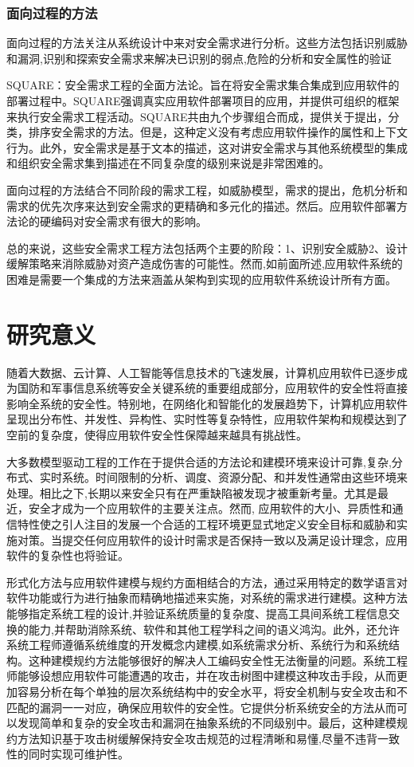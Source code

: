 \subsubsection{面向过程的方法}
\par
面向过程的方法关注从系统设计中来对安全需求进行分析。这些方法包括识别威胁和漏洞,识别和探索安全需求来解决已识别的弱点,危险的分析和安全属性的验证
\par
SQUARE：安全需求工程的全面方法论。旨在将安全需求集合集成到应用软件的部署过程中。SQUARE强调真实应用软件部署项目的应用，并提供可组织的框架来执行安全需求工程活动。SQUARE共由九个步骤组合而成，提供关于提出，分类，排序安全需求的方法。但是，这种定义没有考虑应用软件操作的属性和上下文行为。此外，安全需求是基于文本的描述，这对讲安全需求与其他系统模型的集成和组织安全需求集到描述在不同复杂度的级别来说是非常困难的。
\par
面向过程的方法结合不同阶段的需求工程，如威胁模型，需求的提出，危机分析和需求的优先次序来达到安全需求的更精确和多元化的描述。然后。应用软件部署方法论的硬编码对安全需求有很大的影响。
\par
总的来说，这些安全需求工程方法包括两个主要的阶段：1、识别安全威胁2、设计缓解策略来消除威胁对资产造成伤害的可能性。然而,如前面所述,应用软件系统的困难是需要一个集成的方法来涵盖从架构到实现的应用软件系统设计所有方面。
\section{研究意义}
\par
随着大数据、云计算、人工智能等信息技术的飞速发展，计算机应用软件已逐步成为国防和军事信息系统等安全关键系统的重要组成部分，应用软件的安全性将直接影响全系统的安全性。特别地，在网络化和智能化的发展趋势下，计算机应用软件呈现出分布性、并发性、异构性、实时性等复杂特性，应用软件架构和规模达到了空前的复杂度，使得应用软件安全性保障越来越具有挑战性。
\par
大多数模型驱动工程的工作在于提供合适的方法论和建模环境来设计可靠,复杂,分布式、实时系统。时间限制的分析、调度、资源分配、和并发性通常由这些环境来处理。相比之下,长期以来安全只有在严重缺陷被发现才被重新考量。尤其是最近，安全才成为一个应用软件的主要关注点。然而, 应用软件的大小、异质性和通信特性使之引人注目的发展一个合适的工程环境更显式地定义安全目标和威胁和实施对策。当提交任何应用软件的设计时需求是否保持一致以及满足设计理念，应用软件的复杂性也将验证。
\par
形式化方法与应用软件建模与规约方面相结合的方法，通过采用特定的数学语言对软件功能或行为进行抽象而精确地描述来实施，对系统的需求进行建模。这种方法能够指定系统工程的设计,并验证系统质量的复杂度、提高工具间系统工程信息交换的能力,并帮助消除系统、软件和其他工程学科之间的语义鸿沟。此外，还允许系统工程师遵循系统维度的开发概念内建模,如系统需求分析、系统行为和系统结构。这种建模规约方法能够很好的解决人工编码安全性无法衡量的问题。系统工程师能够设想应用软件可能遭遇的攻击，并在攻击树图中建模这种攻击手段，从而更加容易分析在每个单独的层次系统结构中的安全水平，将安全机制与安全攻击和不匹配的漏洞一一对应，确保应用软件的安全性。它提供分析系统安全的方法从而可以发现简单和复杂的安全攻击和漏洞在抽象系统的不同级别中。最后，这种建模规约方法知识基于攻击树缓解保持安全攻击规范的过程清晰和易懂,尽量不违背一致性的同时实现可维护性。
